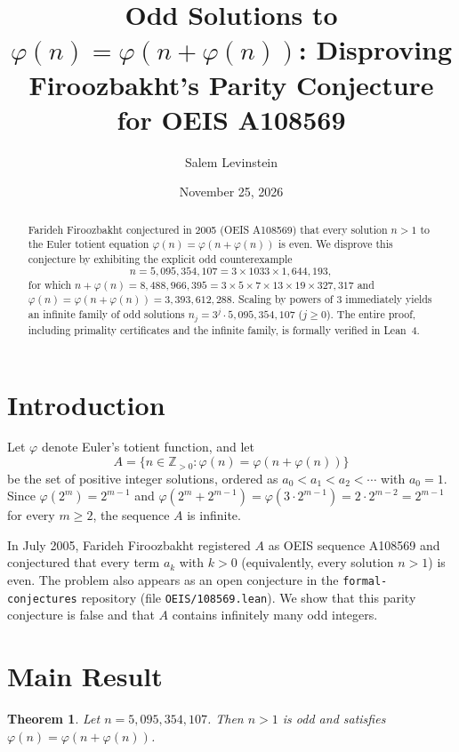 \documentclass[11pt]{article}
\title{Odd Solutions to $\varphi(n) = \varphi(n + \varphi(n))$: Disproving Firoozbakht's Parity Conjecture for OEIS A108569}
\author{Salem Levinstein}
\date{November 25, 2026}
\newtheorem{theorem}{Theorem}
\begin{document}
\maketitle

\begin{abstract}
Farideh Firoozbakht conjectured in 2005 (OEIS A108569) that every solution $n > 1$ to the Euler totient equation $\varphi(n) = \varphi(n + \varphi(n))$ is even. We disprove this conjecture by exhibiting the explicit odd counterexample
\[
  n = 5{,}095{,}354{,}107 = 3 \times 1033 \times 1{,}644{,}193,
\]
for which $n + \varphi(n) = 8{,}488{,}966{,}395 = 3 \times 5 \times 7 \times 13 \times 19 \times 327{,}317$ and $\varphi(n) = \varphi(n + \varphi(n)) = 3{,}393{,}612{,}288$. Scaling by powers of $3$ immediately yields an infinite family of odd solutions $n_j = 3^j \cdot 5{,}095{,}354{,}107$ ($j \ge 0$). The entire proof, including primality certificates and the infinite family, is formally verified in Lean~4.
\end{abstract}

\section{Introduction}

Let $\varphi$ denote Euler's totient function, and let
\[
  A = \{n \in \mathbb{Z}_{>0} : \varphi(n) = \varphi(n + \varphi(n))\}
\]
be the set of positive integer solutions, ordered as $a_0 < a_1 < a_2 < \cdots$ with $a_0 = 1$. Since $\varphi(2^m) = 2^{m-1}$ and $\varphi(2^m + 2^{m-1}) = \varphi(3 \cdot 2^{m-1}) = 2 \cdot 2^{m-2} = 2^{m-1}$ for every $m \ge 2$, the sequence $A$ is infinite.

In July 2005, Farideh Firoozbakht registered $A$ as OEIS sequence A108569 and conjectured that every term $a_k$ with $k > 0$ (equivalently, every solution $n > 1$) is even. The problem also appears as an open conjecture in the \texttt{formal-conjectures} repository (file \texttt{OEIS/108569.lean}). We show that this parity conjecture is false and that $A$ contains infinitely many odd integers.

\section{Main Result}

\begin{theorem}\label{thm:counterexample}
Let $n = 5{,}095{,}354{,}107$. Then $n > 1$ is odd and satisfies $\varphi(n) = \varphi(n + \varphi(n))$.
\end{theorem}
\end{document}

